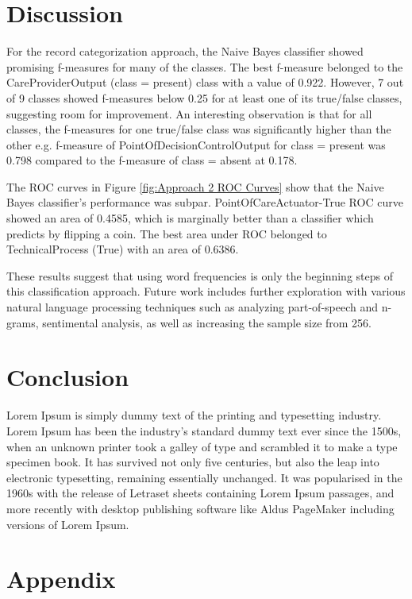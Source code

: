 \documentclass[11pt, notitlepage,abstracton,oneside]{article}   	%
\begin{document}
\section{Discussion}

For the record categorization approach, the Naive Bayes classifier showed promising f-measures for many of the classes. The best f-measure belonged to the CareProviderOutput (class = present) class with a value of 0.922. However, 7 out of 9 classes showed f-measures below 0.25 for at least one of its true/false classes, suggesting room for improvement. An interesting observation is that for all classes, the f-measures for one true/false class was significantly higher than the other e.g. f-measure of PointOfDecisionControlOutput for class = present was 0.798 compared to the f-measure of class = absent at 0.178.

The ROC curves in Figure \ref{fig:Approach 2 ROC Curves} show that the Naive Bayes classifier's performance was subpar. PointOfCareActuator-True ROC curve showed an area of 0.4585, which is marginally better than a classifier which predicts by flipping a coin. The best area under ROC belonged to TechnicalProcess (True) with an area of 0.6386.

These results suggest that using word frequencies is only the beginning steps of this classification approach. Future work includes further exploration with various natural language processing techniques such as analyzing part-of-speech and n-grams, sentimental analysis, as well as increasing the sample size from 256.

\section{Conclusion}
Lorem Ipsum is simply dummy text of the printing and typesetting industry. Lorem Ipsum has been the industry's standard dummy text ever since the 1500s, when an unknown printer took a galley of type and scrambled it to make a type specimen book. It has survived not only five centuries, but also the leap into electronic typesetting, remaining essentially unchanged. It was popularised in the 1960s with the release of Letraset sheets containing Lorem Ipsum passages, and more recently with desktop publishing software like Aldus PageMaker including versions of Lorem Ipsum.

\section{Appendix}
\end{document}
